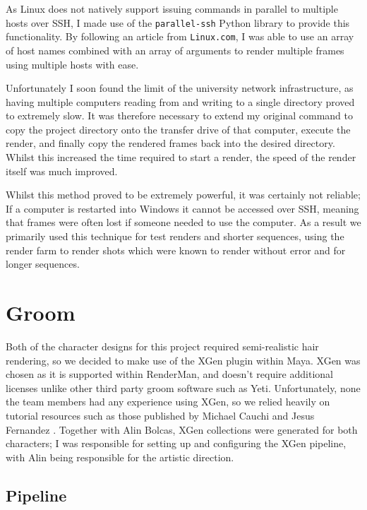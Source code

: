 \documentclass[11pt]{article}
\begin{document}
As Linux does not natively support issuing commands in parallel to multiple hosts over SSH, I made use of the \texttt{parallel-ssh}\cite{pssh} Python library to provide this functionality. By following an article from \texttt{Linux.com}\cite{martin_2008}, I was able to use an array of host names combined with an array of arguments to render multiple frames using multiple hosts with ease.

Unfortunately I soon found the limit of the university network infrastructure, as having multiple computers reading from and writing to a single directory proved to extremely slow. It was therefore necessary to extend my original command to copy the project directory onto the transfer drive of that computer, execute the render, and finally copy the rendered frames back into the desired directory. Whilst this increased the time required to start a render, the speed of the render itself was much improved.

Whilst this method proved to be extremely powerful, it was certainly not reliable; If a computer is restarted into Windows it cannot be accessed over SSH, meaning that frames were often lost if someone needed to use the computer. As a result we primarily used this technique for test renders and shorter sequences, using the render farm to render shots which were known to render without error and for longer sequences.

\section{Groom}

Both of the character designs for this project required semi-realistic hair rendering, so we decided to make use of the XGen plugin within Maya. XGen was chosen as it is supported within RenderMan, and doesn't require additional licenses unlike other third party groom software such as Yeti. Unfortunately, none the team members had any experience using XGen, so we relied heavily on tutorial resources such as those published by Michael Cauchi \cite{cauchi_2017} and Jesus Fernandez \cite{fernandez_2018}. Together with Alin Bolcas, XGen collections were generated for both characters; I was responsible for setting up and configuring the XGen pipeline, with Alin being responsible for the artistic direction.

\subsection{Pipeline} \label{threadsafe}
\end{document}
